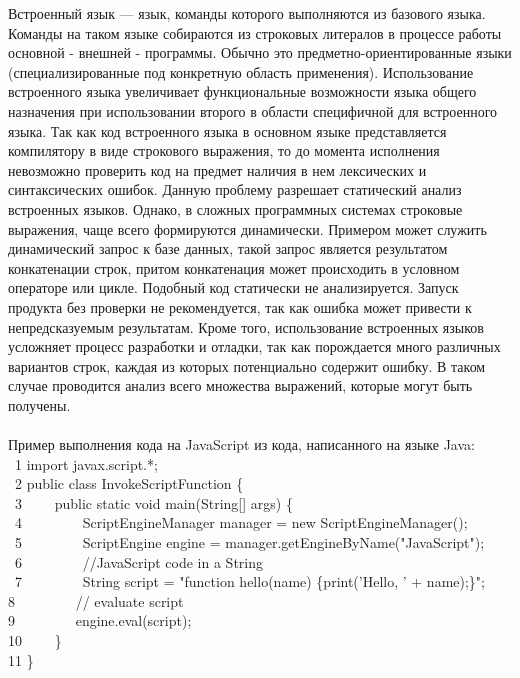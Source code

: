\documentclass{matmex-diploma}
\begin{document}
	Встроенный язык — язык, команды которого выполняются из базового языка. Команды на таком языке собираются из строковых литералов в процессе работы основной - внешней - программы. Обычно это предметно-ориентированные языки (специализированные под конкретную область применения). Использование встроенного языка увеличивает функциональные возможности языка общего назначения при использовании второго в области специфичной для встроенного языка. Так как код встроенного языка в основном языке представляется компилятору в виде строкового выражения, то до момента исполнения невозможно проверить код на предмет наличия в нем  лексических и синтаксических ошибок. Данную проблему разрешает статический анализ встроенных языков. Однако, в сложных программных системах строковые выражения, чаще всего формируются динамически. Примером может служить динамический запрос к базе данных, такой запрос является результатом конкатенации строк, притом конкатенация может происходить в условном операторе или цикле.  Подобный код статически не анализируется. Запуск продукта без проверки не рекомендуется, так как ошибка может привести к непредсказуемым результатам. Кроме того,  использование встроенных языков усложняет процесс разработки и отладки, так как порождается много различных вариантов строк, каждая из которых потенциально содержит ошибку. В таком случае проводится анализ всего множества выражений, которые могут быть получены.\\
	\\
	Пример выполнения кода на JavaScript из кода, написанного на языке Java:\\
\ 1 import javax.script.*;\\
\ 2 public class InvokeScriptFunction \{\\
\ 3 \ \ \ \ public static void main(String[] args) \{\\
\ 4 \ \ \ \ \ \ \ \ ScriptEngineManager manager = new ScriptEngineManager();\\
\ 5 \ \ \ \ \ \ \ \ ScriptEngine engine = manager.getEngineByName("JavaScript");\\
\ 6 \ \ \ \ \ \ \ \ //JavaScript code in a String\\
\ 7 \ \ \ \ \ \ \ \         String script = "function hello(name) \{print('Hello, ' + name);\}";\\
8 \ \ \ \ \ \ \ \ // evaluate script\\
9 \ \ \ \ \ \ \ \ engine.eval(script);\\
10 \ \ \ \     \}\\
11 \}\\
\end{document}
